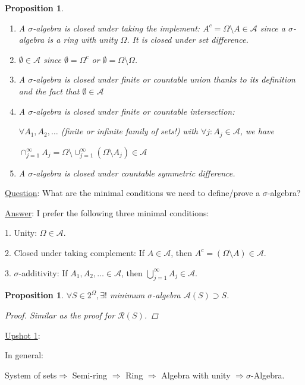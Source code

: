 \documentclass[12pt]{article}
\theoremstyle{blueplain}
\newtheorem{proposition}[theorem]{Proposition}
\theoremstyle{bluedef}
\theoremstyle{blueremark}
\numberwithin{equation}{section}
\begin{document}
\begin{proposition}
  \begin{enumerate}
    \item A $\sigma$-algebra is closed under taking the implement: $A^c = \Omega \setminus A \in \mathcal{A}$ since a $\sigma$-algebra is a ring with unity $\Omega$. It is closed under set difference.
    \item $\emptyset \in \mathcal{A}$ since $\emptyset = \Omega^c$ or $\emptyset = \Omega \setminus \Omega$.
    \item A $\sigma$-algebra is closed under finite or countable union thanks to its definition and the fact that $\emptyset \in \mathcal{A}$
    \item A $\sigma$-algebra is closed under finite or countable intersection:

          $\forall A_1, A_2, \ldots$ (finite or infinite family of sets!) with $\forall j: A_j \in \mathcal{A}$, we have

          $\cap_{j=1}^{\infty} A_j = \Omega \setminus \cup_{j=1}^{\infty} (\Omega \setminus A_j) \in \mathcal{A}$
    \item A $\sigma$-algebra is closed under countable symmetric difference.
  \end{enumerate}
\end{proposition}

\underline{Question}: What are the minimal conditions we need to define/prove a $\sigma$-algebra?

\underline{Answer}: I prefer the following three minimal conditions:

1. Unity: $\Omega \in \mathcal{A}$.

2. Closed under taking complement: If $A \in \mathcal{A}$, then $A^c = (\Omega \setminus A) \in \mathcal{A}$.

3. $\sigma$-additivity: If $A_1, A_2, \ldots \in \mathcal{A}$, then $\bigcup_{j=1}^\infty A_j \in \mathcal{A}$.

\begin{proposition}
  $\forall S \in 2^\Omega, \exists !$ minimum $\sigma$-algebra $\mathcal{A}(S) \supset S$.
  \begin{proof}
    Similar as the proof for $\mathcal{R}(S)$.
  \end{proof}
\end{proposition}

\underline{Upshot 1}:

In general:

System of sets$\Rightarrow$ Semi-ring $\Rightarrow$ Ring $\Rightarrow$ Algebra with unity $\Rightarrow \sigma$-Algebra.
\end{document}
